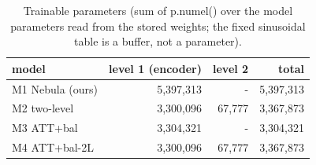 \begin{table}[t]
\centering
\small
\caption{Trainable parameters (sum of p.numel() over the model parameters read from the stored weights; the fixed sinusoidal table is a buffer, not a parameter).}
\label{tab:T3_parameter_counts}
\begin{tabular}{lrrr}
\toprule
model & level 1 (encoder) & level 2 & total \\
\midrule
M1 Nebula (ours) & 5,397,313 & - & 5,397,313 \\
M2 two-level & 3,300,096 & 67,777 & 3,367,873 \\
M3 ATT+bal & 3,304,321 & - & 3,304,321 \\
M4 ATT+bal-2L & 3,300,096 & 67,777 & 3,367,873 \\
\bottomrule
\end{tabular}
\end{table}
